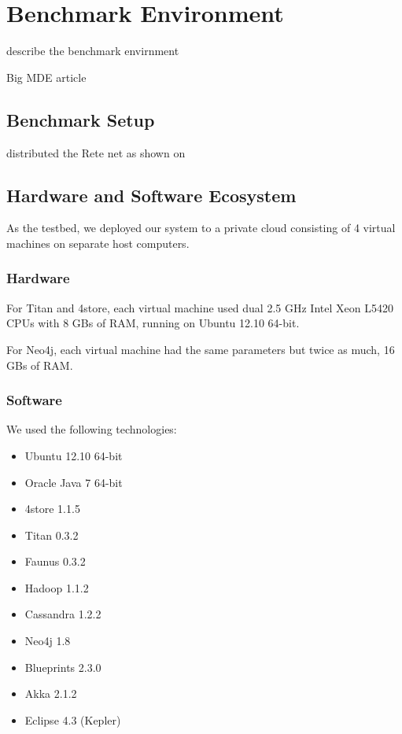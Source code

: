 \section{Benchmark Environment}
\label{sec:benchmark-environment}

describe the benchmark envirnment


Big MDE article \cite{Izso:2013:IIG:2487766.2487772}

\subsection{Benchmark Setup}


distributed the Rete net as shown on 


\subsection{Hardware and Software Ecosystem}

As the testbed, we deployed our system to a private cloud consisting of 4 virtual machines on separate host computers. 

\subsubsection{Hardware}
 
For Titan and 4store, each virtual machine used dual 2.5 GHz Intel Xeon L5420 CPUs with 8 GBs of RAM, running on Ubuntu 12.10 64-bit.

For Neo4j, each virtual machine had the same parameters but twice as much, 16 GBs of RAM. 

\subsubsection{Software}

We used the following technologies:

\begin{itemize}
  \item Ubuntu 12.10 64-bit
  \item Oracle Java 7 64-bit
  \item 4store 1.1.5
  \item Titan 0.3.2
  \item Faunus 0.3.2
  \item Hadoop 1.1.2
  \item Cassandra 1.2.2
  \item Neo4j 1.8
  \item Blueprints 2.3.0
  \item Akka 2.1.2
  \item Eclipse 4.3 (Kepler)
\end{itemize}

